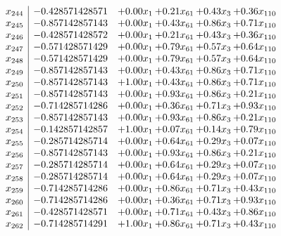 \documentclass[8pt]{article}
\begin{document}
\[\begin{array}{c| c c@{\hskip 2pt} c@{\hskip 2pt} c@{\hskip 2pt} c@{\hskip 2pt} }
 x_{244}   &  -0.428571428571 & +  0.00 x_{1} & +  0.21 x_{61} & +  0.43 x_{3} & +  0.36 x_{110}\\
 x_{245}   &  -0.857142857143 & +  0.00 x_{1} & +  0.43 x_{61} & +  0.86 x_{3} & +  0.71 x_{110}\\
 x_{246}   &  -0.428571428572 & +  0.00 x_{1} & +  0.21 x_{61} & +  0.43 x_{3} & +  0.36 x_{110}\\
 x_{247}   &  -0.571428571429 & +  0.00 x_{1} & +  0.79 x_{61} & +  0.57 x_{3} & +  0.64 x_{110}\\
 x_{248}   &  -0.571428571429 & +  0.00 x_{1} & +  0.79 x_{61} & +  0.57 x_{3} & +  0.64 x_{110}\\
 x_{249}   &  -0.857142857143 & +  0.00 x_{1} & +  0.43 x_{61} & +  0.86 x_{3} & +  0.71 x_{110}\\
 x_{250}   &  -0.857142857143 & +  1.00 x_{1} & +  0.43 x_{61} & +  0.86 x_{3} & +  0.71 x_{110}\\
 x_{251}   &  -0.857142857143 & +  0.00 x_{1} & +  0.93 x_{61} & +  0.86 x_{3} & +  0.21 x_{110}\\
 x_{252}   &  -0.714285714286 & +  0.00 x_{1} & +  0.36 x_{61} & +  0.71 x_{3} & +  0.93 x_{110}\\
 x_{253}   &  -0.857142857143 & +  0.00 x_{1} & +  0.93 x_{61} & +  0.86 x_{3} & +  0.21 x_{110}\\
 x_{254}   &  -0.142857142857 & +  1.00 x_{1} & +  0.07 x_{61} & +  0.14 x_{3} & +  0.79 x_{110}\\
 x_{255}   &  -0.285714285714 & +  0.00 x_{1} & +  0.64 x_{61} & +  0.29 x_{3} & +  0.07 x_{110}\\
 x_{256}   &  -0.857142857143 & +  0.00 x_{1} & +  0.93 x_{61} & +  0.86 x_{3} & +  0.21 x_{110}\\
 x_{257}   &  -0.285714285714 & +  0.00 x_{1} & +  0.64 x_{61} & +  0.29 x_{3} & +  0.07 x_{110}\\
 x_{258}   &  -0.285714285714 & +  0.00 x_{1} & +  0.64 x_{61} & +  0.29 x_{3} & +  0.07 x_{110}\\
 x_{259}   &  -0.714285714286 & +  0.00 x_{1} & +  0.86 x_{61} & +  0.71 x_{3} & +  0.43 x_{110}\\
 x_{260}   &  -0.714285714286 & +  0.00 x_{1} & +  0.36 x_{61} & +  0.71 x_{3} & +  0.93 x_{110}\\
 x_{261}   &  -0.428571428571 & +  0.00 x_{1} & +  0.71 x_{61} & +  0.43 x_{3} & +  0.86 x_{110}\\
 x_{262}   &  -0.714285714291 & +  1.00 x_{1} & +  0.86 x_{61} & +  0.71 x_{3} & +  0.43 x_{110}\\

\end{array}\]
\end{document}
